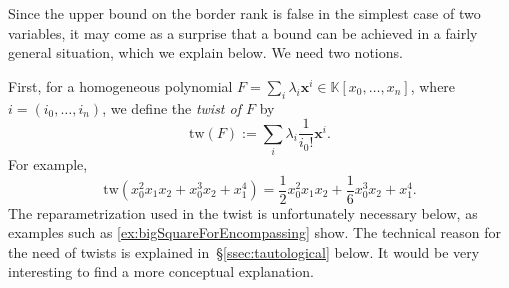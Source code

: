 \documentclass[a4paper,11pt,reqno]{amsart}
\newcommand{\bfx}{\mathbf{x}}
\newcommand{\bbK}{\mathbb{K}}
\DeclareMathOperator{\brk}{brk}
\DeclareMathOperator{\rk}{rk}
\newcommand{\jjinfo}[1]{\todo[color=yellow!40,bordercolor=brown,size=\footnotesize]{\textbf{TODO: }#1}}
\newcommand{\cftodo}[1]{\todo[color=darkred!40,bordercolor=darkred,size=\footnotesize]{\textbf{TODO: }#1}}
\newcommand{\oldtext}[1]{\textcolor{darkelectricblue}{#1}}
\numberwithin{equation}{section}
\theoremstyle{definition}
\theoremstyle{plain}
\theoremstyle{remark}
\newtheorem{exam}[defn]{Example}
\begin{document}

    Since the upper bound on the border rank is {false} in the {simplest} case of
    two variables, it may come as a surprise that a bound can be achieved
    in a fairly general situation, which we explain below. We need two
    notions.

    \newcommand{\twist}[1]{\mathrm{tw}(#1)}

    First, for a homogeneous
    polynomial $F = \sum_{i}
    \lambda_i \bfx^{i}\in \bbK[x_0, \ldots ,x_n]$, where $i=(i_0,\dots,i_n)$, we define the \emph{twist of $F$} by
    \[
        \twist{F} := \sum_{i} \lambda_i\frac{1}{i_0!} \bfx^i.
    \]
    For example,
    \[\twist{x_0^2x_1x_2 + x_0^3 x_2 + x_1^4} = \frac{1}{2}x_0^2x_1x_2 +
    \frac{1}{6}x_0^3x_2 + x_1^4.\]
    The reparametrization used in the twist is unfortunately necessary below, as examples such as \autoref{ex:bigSquareForEncompassing} show. The technical reason for the need of twists is explained in~\S\ref{ssec:tautological} below. It would be very interesting to find a more conceptual explanation.
\end{document}
